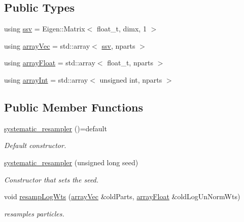 \subsection*{Public Types}
\begin{DoxyCompactItemize}
\item 
using \hyperlink{classsystematic__resampler_a9e158fbf5875f93e9cb4da562928e649}{ssv} = Eigen\+::\+Matrix$<$ float\+\_\+t, dimx, 1 $>$
\item 
using \hyperlink{classsystematic__resampler_a89263b385b61687341d67a717da78dc1}{array\+Vec} = std\+::array$<$ \hyperlink{classrbase_ae20e0b8df15aa109252f57ecbf1f20f8}{ssv}, nparts $>$
\item 
using \hyperlink{classsystematic__resampler_ae3f8e7d5687c068b7fc320fe4ee67871}{array\+Float} = std\+::array$<$ float\+\_\+t, nparts $>$
\item 
using \hyperlink{classsystematic__resampler_afbdf5779938dfee726f87d31040284de}{array\+Int} = std\+::array$<$ unsigned int, nparts $>$
\end{DoxyCompactItemize}
\subsection*{Public Member Functions}
\begin{DoxyCompactItemize}
\item 
\mbox{\label{classsystematic__resampler_a6422f70f1f5315d16b018cb855435511}} 
\hyperlink{classsystematic__resampler_a6422f70f1f5315d16b018cb855435511}{systematic\+\_\+resampler} ()=default
\begin{DoxyCompactList}\small\item\em Default constructor. \end{DoxyCompactList}\item 
\hyperlink{classsystematic__resampler_a815d21a8e8f3e715462e11752a73c2bd}{systematic\+\_\+resampler} (unsigned long seed)
\begin{DoxyCompactList}\small\item\em Constructor that sets the seed. \end{DoxyCompactList}\item 
void \hyperlink{classsystematic__resampler_a9467aec6002043f35f40e9e4857021ed}{resamp\+Log\+Wts} (\hyperlink{classrbase_aa12fc826befa6ba0647b5f59ebc396ee}{array\+Vec} \&old\+Parts, \hyperlink{classrbase_a6f76bef853e508cb5b6f546d231b06f5}{array\+Float} \&old\+Log\+Un\+Norm\+Wts)
\begin{DoxyCompactList}\small\item\em resamples particles. \end{DoxyCompactList}\end{DoxyCompactItemize}
